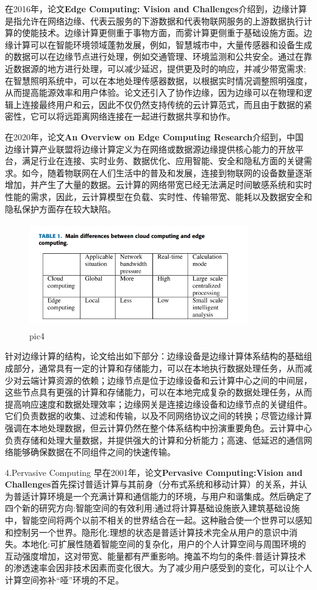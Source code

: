 \documentclass[a4paper,twoside]{scrbook}
\begin{document}
在2016年，论文\textbf{Edge Computing: Vision and Challenges}介绍到，边缘计算是指允许在网络边缘、代表云服务的下游数据和代表物联网服务的上游数据执行计算的使能技术。边缘计算更侧重于事物方面，而雾计算更侧重于基础设施方面。边缘计算可以在智能环境领域蓬勃发展，例如，智慧城市中，大量传感器和设备生成的数据可以在边缘节点进行处理，例如交通管理、环境监测和公共安全。通过在靠近数据源的地方进行处理，可以减少延迟，提供更及时的响应，并减少带宽需求;在智慧照明系统中，可以在本地处理传感器数据，以根据实时情况调整照明强度，从而提高能源效率和用户体验。论文还引入了协作边缘，因为边缘可以在物理和逻辑上连接最终用户和云，因此不仅仍然支持传统的云计算范式，而且由于数据的紧密性，它可以将远距离网络连接在一起进行数据共享和协作。

在2020年，论文\textbf{An Overview on Edge Computing Research}介绍到，中国边缘计算产业联盟将边缘计算定义为在网络或数据源边缘提供核心能力的开放平台，满足行业在连接、实时业务、数据优化、应用智能、安全和隐私方面的关键需求。如今，随着物联网在人们生活中的普及和发展，连接到物联网的设备数量逐渐增加，并产生了大量的数据。云计算的网络带宽已经无法满足时间敏感系统和实时性能的需求，因此，云计算模型在负载、实时性、传输带宽、能耗以及数据安全和隐私保护方面存在较大缺陷。
\begin{figure}
\centering %
\includegraphics[height=4.5cm,width=9.5cm]{edge1.png}
\caption{pic4}
\end{figure}
针对边缘计算的结构，论文给出如下部分：边缘设备是边缘计算体系结构的基础组成部分，通常具有一定的计算和存储能力，可以在本地执行数据处理任务，从而减少对云端计算资源的依赖；边缘节点是位于边缘设备和云计算中心之间的中间层，这些节点具有更强的计算和存储能力，可以在本地完成复杂的数据处理任务，从而提高响应速度和数据处理效率；边缘网关是连接边缘设备和边缘节点的关键组件。它们负责数据的收集、过滤和传输，以及不同网络协议之间的转换；尽管边缘计算强调在本地处理数据，但云计算仍然在整个体系结构中扮演重要角色。云计算中心负责存储和处理大量数据，并提供强大的计算和分析能力；高速、低延迟的通信网络能够确保数据在不同组件之间的快速传输。

4.Pervasive Computing
早在2001年，论文\textbf{Pervasive Computing:Vision and Challenges}首先探讨普适计算与其前身（分布式系统和移动计算）的关系，并认为普适计算环境是一个充满计算和通信能力的环境，与用户和谐集成。然后确定了四个新的研究方向:智能空间的有效利用:通过将计算基础设施嵌入建筑基础设施中，智能空间将两个以前不相关的世界结合在一起。这种融合使一个世界可以感知和控制另一个世界。隐形化:理想的状态是普适计算技术完全从用户的意识中消失。本地化:可扩展性随着智能空间的复杂化，用户的个人计算空间与周围环境的互动强度增加，这对带宽、能量都有严重影响。掩盖不均匀的条件:普适计算技术的渗透速率会因非技术因素而变化很大。为了减少用户感受到的变化，可以让个人计算空间弥补“哑”环境的不足。
\end{document}

